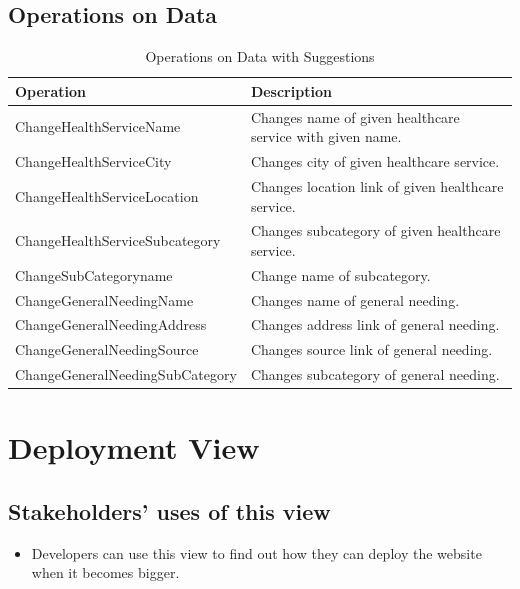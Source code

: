\subsection{Operations on Data}
\begin{table}[H]
    \begin{tabular}{|p{6cm}|p{10cm}|}
        \hline
        \textbf{Operation}   & \textbf{Description}                                                                                                                                    \\
        \hline
        \hline
        ChangeHealthServiceName & Changes name of given healthcare service with given name.\\
        \hline
        ChangeHealthServiceCity & Changes city of given healthcare service.\\
        \hline
        ChangeHealthServiceLocation & Changes location link of given healthcare service. \\
        \hline
        ChangeHealthServiceSubcategory & Changes subcategory of given healthcare service.\\
        \hline
        ChangeSubCategoryname & Change name of subcategory.\\
        \hline
        ChangeGeneralNeedingName & Changes name of general needing.\\
        \hline
        ChangeGeneralNeedingAddress & Changes address link of general needing.\\
        \hline
        ChangeGeneralNeedingSource & Changes source link of general needing.\\
        \hline 
        ChangeGeneralNeedingSubCategory & Changes subcategory of general needing.\\
        \hline
    \end{tabular}
    \caption[Operations on Data with Suggestions]{Operations on Data with Suggestions}
\end{table}


\section{Deployment View}

\subsection{Stakeholders' uses of this view}
\begin{itemize}
    \item Developers can use this view to find out how they can deploy the website when it becomes bigger.
\end{itemize}


